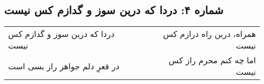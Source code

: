 \begin{center}
\section*{شماره ۴: دردا که درین سوز و گدازم کس نیست}
\label{sec:004}
\begin{longtable}{l p{0.5cm} r}
دردا که درین سوز و گدازم کس نیست
&&
همراه، درین راه درازم کس نیست
\\
در قعرِ دلم جواهر راز بسی است
&&
اما چه کنم محرم راز کس نیست
\\
\end{longtable}
\end{center}
